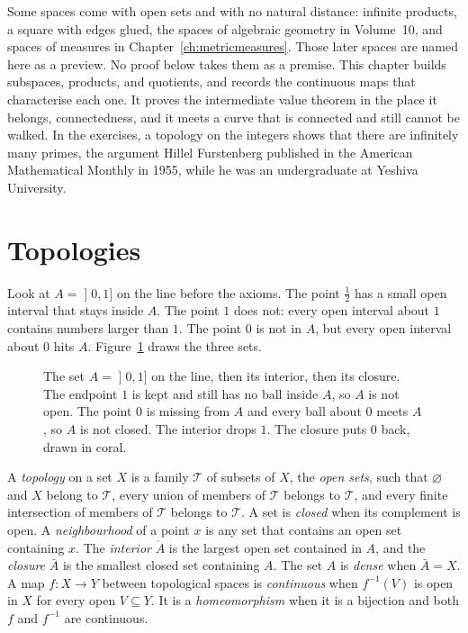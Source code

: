 Some spaces come with open sets and with no natural distance: infinite products, a square with edges glued, the spaces of algebraic geometry in Volume~10, and spaces of measures in Chapter~\ref{ch:metricmeasures}. Those later spaces are named here as a preview. No proof below takes them as a premise. This chapter builds subspaces, products, and quotients, and records the continuous maps that characterise each one. It proves the intermediate value theorem in the place it belongs, connectedness, and it meets a curve that is connected and still cannot be walked. In the exercises, a topology on the integers shows that there are infinitely many primes, the argument Hillel Furstenberg published in the American Mathematical Monthly in 1955, while he was an undergraduate at Yeshiva University.

\section{Topologies}

Look at $A=\mathopen]0,1]$ on the line before the axioms. The point $\frac12$ has a small open interval that stays inside $A$. The point $1$ does not: every open interval about $1$ contains numbers larger than $1$. The point $0$ is not in $A$, but every open interval about $0$ hits $A$. Figure~\ref{fig:ch03-openclosed} draws the three sets.

\begin{figure}[ht]
\centering
{}
\caption{The set $A=\mathopen]0,1]$ on the line, then its interior, then its closure. The endpoint $1$ is kept and still has no ball inside $A$, so $A$ is not open. The point $0$ is missing from $A$ and every ball about $0$ meets $A$, so $A$ is not closed. The interior drops $1$. The closure puts $0$ back, drawn in coral.}
\label{fig:ch03-openclosed}
\end{figure}

\begin{definition}
A \emph{topology} on a set $X$ is a family $\mathcal T$ of subsets of $X$, the \emph{open sets}, such that $\varnothing$ and $X$ belong to $\mathcal T$, every union of members of $\mathcal T$ belongs to $\mathcal T$, and every finite intersection of members of $\mathcal T$ belongs to $\mathcal T$. A set is \emph{closed} when its complement is open. A \emph{neighbourhood} of a point $x$ is any set that contains an open set containing $x$. The \emph{interior} $\mathring A$ is the largest open set contained in $A$, and the \emph{closure} $\bar A$ is the smallest closed set containing $A$. The set $A$ is \emph{dense} when $\bar A=X$. A map $f:X\to Y$ between topological spaces is \emph{continuous} when $f^{-1}(V)$ is open in $X$ for every open $V\subseteq Y$. It is a \emph{homeomorphism} when it is a bijection and both $f$ and $f^{-1}$ are continuous.
\end{definition}

